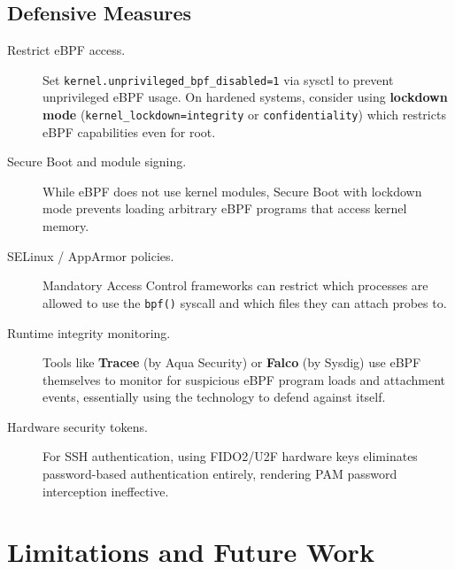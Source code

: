 \documentclass[11pt,a4paper]{article}
\begin{document}
\subsection{Defensive Measures}
\label{subsec:defenses}

\begin{description}
    \item[Restrict eBPF access.]
        Set \texttt{kernel.unprivileged\_bpf\_disabled=1} via sysctl to prevent
        unprivileged eBPF usage. On hardened systems, consider using
        \textbf{lockdown mode}
        (\texttt{kernel\_lockdown=\allowbreak{}integrity} or
        \texttt{confidentiality}) which restricts eBPF capabilities even for
        root.

    \item[Secure Boot and module signing.]
        While eBPF does not use kernel modules, Secure Boot with lockdown mode
        prevents loading arbitrary eBPF programs that access kernel memory.

    \item[SELinux / AppArmor policies.]
        Mandatory Access Control frameworks can restrict which processes are
        allowed to use the \texttt{bpf()} syscall and which files they can
        attach probes to.

    \item[Runtime integrity monitoring.]
        Tools like \textbf{Tracee} (by Aqua Security) or \textbf{Falco}
        (by Sysdig) use eBPF themselves to monitor for suspicious eBPF program
        loads and attachment events, essentially using the technology to defend
        against itself.

    \item[Hardware security tokens.]
        For SSH authentication, using FIDO2/U2F hardware keys eliminates
        password-based authentication entirely, rendering PAM password
        interception ineffective.
\end{description}


\section{Limitations and Future Work}
\label{sec:limitations}
\end{document}

